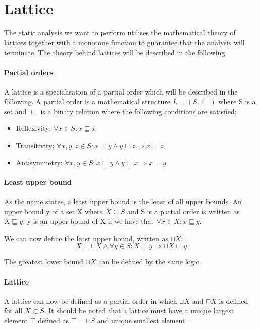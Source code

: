 \section{Lattice}\label{lattice}
The static analysis we want to perform utilises the mathematical theory of lattices together with a monotone function to guarantee that the analysis will terminate.
The theory behind lattices will be described in the following.

\paragraph{Partial orders}
A lattice is a specialisation of a partial order which will be described in the following.
A partial order is a mathematical structure $L = (S, \sqsubseteq)$ where S is a set and $\sqsubseteq$ is a binary relation where the following conditions are satisfied:
\begin{itemize}
  \item Reflexivity: $\forall x \in S : x \sqsubseteq x$
  \item Transitivity: $\forall x,y,z \in S : x \sqsubseteq y \wedge y \sqsubseteq z \Rightarrow x \sqsubseteq z$
  \item Antisymmetry: $\forall x,y \in S: x \sqsubseteq y \wedge y \sqsubseteq x \Rightarrow x = y$
\end{itemize}

\paragraph{Least upper bound}
As the name states, a least upper bound is the least of all upper bounds.
An upper bound y of a set X where $ X \subseteq S$ and S is a partial order is written as $X \sqsubseteq y$.
y is an upper bound of X if we have that $\forall x \in X : x \sqsubseteq y$.

We can now define the least upper bound, written as $\sqcup X$:
\[X \sqsubseteq \sqcup X \wedge \forall y \in S : X \sqsubseteq y \Rightarrow \sqcup X \sqsubseteq y\]

The greatest lower bound $\sqcap X$ can be defined by the same logic.

\paragraph{Lattice}
A lattice can now be defined as a partial order in which $\sqcup X$ and $\sqcap X$ is defined for all $X \subset S$.
It should be noted  that a lattice must have a unique largest element $\top$ defined as $\top = \sqcup S$ and unique smallest element $\bot$ 

